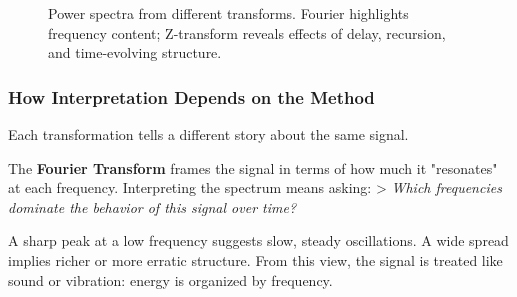\begin{figure}[H]
\centering
{}
\caption{Power spectra from different transforms. Fourier highlights frequency content; Z-transform reveals effects of delay, recursion, and time-evolving structure.}
\end{figure}


\vspace{1em}
\subsubsection{How Interpretation Depends on the Method}

Each transformation tells a different story about the same signal.

The \textbf{Fourier Transform} frames the signal in terms of how much it "resonates" at each frequency. Interpreting the spectrum means asking:  
> \textit{Which frequencies dominate the behavior of this signal over time?}

A sharp peak at a low frequency suggests slow, steady oscillations. A wide spread implies richer or more erratic structure. From this view, the signal is treated like sound or vibration: energy is organized by frequency.

